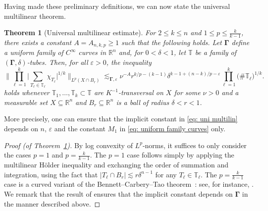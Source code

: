 \documentclass[reqno]{amsart}
\numberwithin{equation}{section}
\newcommand{\R}{\mathbb{R}}
\newcommand{\T}{\mathbb{T}}
\newcommand{\bdGamma}{\boldsymbol{\Gamma}}
\theoremstyle{plain}
\newtheorem{theorem}{Theorem}[section]
\theoremstyle{definition}
\begin{document}
Having made these preliminary definitions, we can now state the universal multilinear theorem. 

\begin{theorem}[Universal multilinear estimate]\label{thm: uni multilin} For $2 \leq k \leq n$ and $1 \leq p \leq \frac{k}{k-1}$, there exists a constant $A = A_{n,k,p} \geq 1$ such that the following holds. Let $\bdGamma$ define a uniform family of $C^{\infty}$ curves in $\R^n$ and, for $0 < \delta < 1$, let $\T$ be a family of $(\bdGamma, \delta)$-tubes. Then, for all $\varepsilon > 0$, the inequality
\begin{equation}\label{eq: uni multilin}
  \Big\|\prod_{\ell = 1}^k \big| \sum_{T_{\ell} \in \T_{\ell}} \chi_{T_{\ell}} \big|^{1/k} \Big\|_{L^p(X \cap B_r)} \lesssim_{\bdGamma, \varepsilon} \nu^{-A} r^{k/p - (k - 1)} \delta^{k - 1 + (n-k)/p - \varepsilon} \prod_{\ell = 1}^k \big(\#\T_{\ell}\big)^{1/k}.
\end{equation}
holds whenever $\T_1, \dots, \T_k \subset \T$ are $K^{-1}$-transversal on $X$ for some $\nu  > 0$ and a measurable set $X \subseteq \R^n$ and $B_r \subseteq \R^n$ is a ball of radius $\delta < r < 1$. 
\end{theorem}

More precisely, one can ensure that the implicit constant in \eqref{eq: uni multilin} depends on $n$, $\varepsilon$ and the constant $M_1$ in \eqref{eq: uniform family curves} only. 


\begin{proof}[Proof (of Theorem~\ref{thm: uni multilin})] By log convexity of $L^p$-norms, it suffices to only consider the cases $p = 1$ and $p = \frac{k}{k-1}$. The $p=1$ case follows simply by applying the multilinear H\"older inequality and exchanging the order of summation and integration, using the fact that $|T_{\ell} \cap B_r| \lesssim r \delta^{n-1}$ for any $T_{\ell} \in \T_{\ell}$. The $p = \frac{k}{k-1}$ case is a curved variant of the Bennett--Carbery--Tao theorem~\cite{BCT2006}: see, for instance, \cite{BG2011, Guth2015}. We remark that the result of \cite{Guth2015} ensures that the implicit constant depends on $\bdGamma$ in the manner described above. 
 \end{proof}






\end{document}
